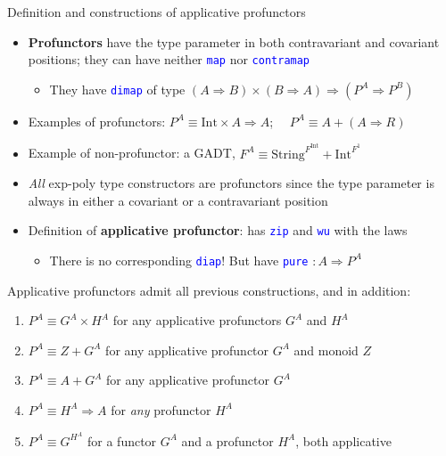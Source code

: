 \documentclass[english]{beamer}
\begin{document}
\begin{frame}{Definition and constructions of applicative profunctors}
\begin{itemize}
\item \vspace{-0.2cm}\textbf{Profunctors} have the type parameter in both
contravariant and covariant positions; they can have neither \texttt{\textcolor{blue}{\footnotesize{}map}}
nor \texttt{\textcolor{blue}{\footnotesize{}contramap}} 
\begin{itemize}
\item They have \texttt{\textcolor{blue}{\footnotesize{}dimap}} of type
{\footnotesize{}$\left(A\Rightarrow B\right)\times\left(B\Rightarrow A\right)\Rightarrow(P^{A}\Rightarrow P^{B})$ }{\footnotesize \par}
\end{itemize}
\item Examples of profunctors: {\footnotesize{}$P^{A}\equiv\text{Int}\times A\Rightarrow A$;
$\quad P^{A}\equiv A+\left(A\Rightarrow R\right)$}{\footnotesize \par}
\item Example of non-profunctor: a GADT, {\footnotesize{}$F^{A}\equiv\text{String}^{F^{\text{Int}}}+\text{Int}^{F^{1}}$}{\footnotesize \par}
\item \emph{All} exp-poly type constructors are profunctors since the type
parameter is always in either a covariant or a contravariant position
\item Definition of \textbf{applicative profunctor}: has \texttt{\textcolor{blue}{\footnotesize{}zip}}
and \texttt{\textcolor{blue}{\footnotesize{}wu}} with the laws
\begin{itemize}
\item There is no corresponding \texttt{\textcolor{blue}{\footnotesize{}diap}}!
But have \texttt{\textcolor{blue}{\footnotesize{}pure}} {\footnotesize{}$:A\Rightarrow P^{A}$} 
\end{itemize}
\end{itemize}
Applicative profunctors admit all previous constructions, and in addition:
\begin{enumerate}
\item $P^{A}\equiv G^{A}\times H^{A}$ for any applicative profunctors $G^{A}$
and $H^{A}$
\item $P^{A}\equiv Z+G^{A}$ for any applicative profunctor $G^{A}$ and
monoid $Z$
\item $P^{A}\equiv A+G^{A}$ for any applicative profunctor $G^{A}$
\item $P^{A}\equiv H^{A}\Rightarrow A$ for \emph{any} profunctor $H^{A}$
\item $P^{A}\equiv G^{H^{A}}$ for a functor $G^{A}$ and a profunctor $H^{A}$,
both applicative
\end{enumerate}
\end{frame}
\end{document}
